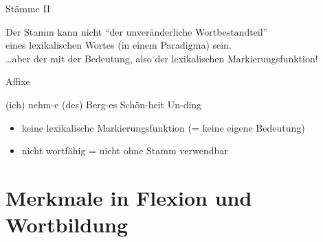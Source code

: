 \begin{frame}
  {Stämme II}
  \begin{exe}
    \ex
    \begin{xlist}
        \pause
        \pause
    \end{xlist}
  \end{exe}
  \pause
  \pause
  \pause
  \pause
  \pause
  Der \alert{Stamm} kann nicht "`der unveränderliche Wortbestandteil"'\\
  eines lexikalischen Wortes (in einem Paradigma) sein.\\
  \Zeile
  \pause
  \alert{\dots aber der mit der Bedeutung, also der lexikalischen Markierungsfunktion}!
\end{frame}

\begin{frame}
  {Affixe}
  \pause
  \begin{exe}
    \ex
    \begin{xlist}
      \ex (ich) nehm\alert<6->{-e}
      \pause
      \ex (des) Berg\alert<7->{-es}
      \pause
      \ex Schön\alert<8->{-heit}
      \pause
      \ex \alert<9->{Un-}ding
    \end{xlist}
  \end{exe}
  \Zeile
  \pause
  \pause
  \pause
  \pause
  \pause
  \begin{itemize}[<+->]
    \item \alert{keine lexikalische Markierungsfunktion} (= keine eigene Bedeutung)
    \item \alert{nicht wortfähig} = nicht ohne Stamm verwendbar
  \end{itemize}
\end{frame}



\section{Merkmale in Flexion und Wortbildung}


